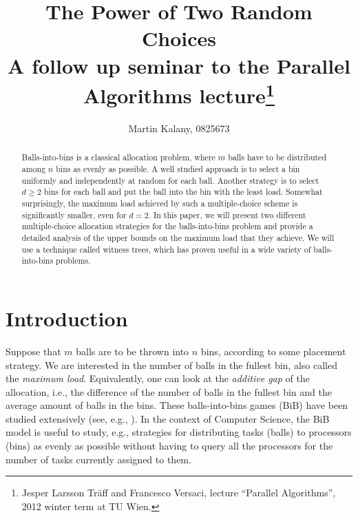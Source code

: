 \documentclass[a4paper,12pt]{article}
\begin{document}
\title{The Power of Two Random Choices\\ 
\large A follow up seminar to the Parallel Algorithms lecture\footnote{Jesper Larsson Tr\"aff and Francesco Versaci, lecture ``Parallel Algorithms'', 2012 winter term at TU Wien.}}
\author{Martin Kalany, 0825673}

\maketitle
\begin{abstract}
Balls-into-bins is a classical allocation problem, where $m$ balls have to be distributed among $n$ bins as evenly as possible. A well studied approach is to select a bin uniformly and independently at random for each ball. Another strategy is to select $d\geq 2$ bins for each ball and put the ball into the bin with the least load. Somewhat surprisingly, the maximum load achieved by such a multiple-choice scheme is significantly smaller, even for $d=2$. In this paper, we will present two different multiple-choice allocation strategies for the balls-into-bins problem and provide a detailed analysis of the upper bounds on the maximum load that they achieve. We will use a technique called witness trees, which has proven useful in a wide variety of balls-into-bins problems.
\end{abstract}

\section{Introduction}
\label{sec:intro}
Suppose that $m$ balls are to be thrown into $n$ bins, according to some placement strategy. We are interested in the number of balls in the fullest bin, also called the \emph{maximum load}. Equivalently, one can look at the \emph{additive gap} of the allocation, i.e., the difference of the number of balls in the fullest bin and the average amount of balls in the bins. These balls-into-bins games (BiB) have been studied extensively (see, e.g., \cite{JK77}). In the context of Computer Science, the BiB model is useful to study, e.g., strategies for distributing tasks (balls) to processors (bins) as evenly as possible without having to query all the processors for the number of tasks currently assigned to them.
\end{document}

